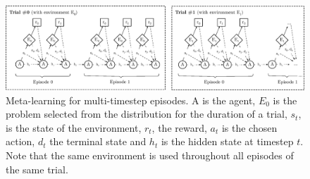 \begin{figure}
	\centering
	\includegraphics[width=\linewidth]{fig/meta_cartpole.eps}
	\caption{Meta-learning for multi-timestep episodes. A is the agent,
	$E_0$ is the problem selected from the distribution for the duration
	of a trial, $s_t$, is the state of the environment, $r_t$, the reward,
	$a_t$ is the chosen action, $d_t$ the terminal state and $h_t$ is
	the hidden state at timestep $t$. Note that the same environment is
	used throughout all episodes of the same trial.}
	\label{fig:meta_cartpole}
\end{figure}



